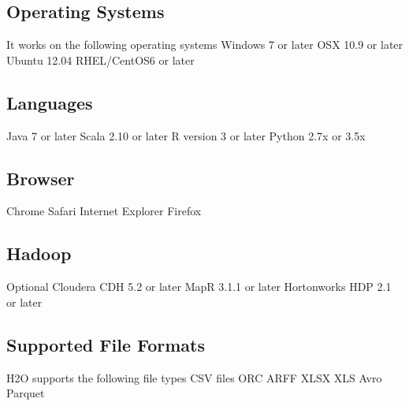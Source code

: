 \documentclass[9pt,twocolumn,twoside]{../../styles/osajnl}
\begin{document}
\subsection{Operating Systems}

It works on the following operating systems 
\newline Windows 7 or later
\newline OSX 10.9 or later
\newline Ubuntu 12.04
\newline RHEL/CentOS6 or later\cite{www-h2o-requirements}

\subsection{Languages}

 Java 7 or later
\newline Scala 2.10 or later
\newline R version 3 or later
\newline Python 2.7x or 3.5x\cite{www-h2o-requirements}
 
\subsection{Browser}

 Chrome
\newline Safari
\newline Internet Explorer
\newline Firefox\cite{www-h2o-requirements}

\subsection{Hadoop}
 Optional Cloudera CDH 5.2 or later
\newline MapR 3.1.1 or later
\newline Hortonworks HDP 2.1 or later\cite{www-h2o-requirements}

\subsection{Supported File Formats}
H2O supports the following file types
\newline CSV files
\newline ORC
\newline ARFF
\newline XLSX
\newline XLS
\newline Avro
\newline Parquet\cite{www-h2o-requirements}
\end{document}

